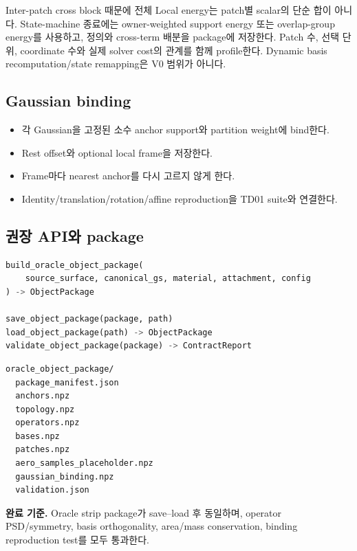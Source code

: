 \documentclass[10pt,a4paper]{article}
\newcommand{\todo}{\textcolor{TodoGray}{\(\square\)}}
\begin{document}
\begin{tcolorbox}[colback=LightOrange,colframe=orange!60!black,title=Patch energy와 계산 단위,fonttitle=\bfseries]
Inter-patch cross block 때문에 전체 Local energy는 patch별 scalar의 단순 합이 아니다.
State-machine 종료에는 owner-weighted support energy 또는 overlap-group energy를 사용하고,
정의와 cross-term 배분을 package에 저장한다. Patch 수, 선택 단위, coordinate 수와 실제 solver cost의 관계를 함께 profile한다.
Dynamic basis recomputation/state remapping은 V0 범위가 아니다.
\end{tcolorbox}

\subsection*{Gaussian binding}

\begin{itemize}
  \item[\todo] 각 Gaussian을 고정된 소수 anchor support와 partition weight에 bind한다.
  \item[\todo] Rest offset와 optional local frame을 저장한다.
  \item[\todo] Frame마다 nearest anchor를 다시 고르지 않게 한다.
  \item[\todo] Identity/translation/rotation/affine reproduction을 TD01 suite와 연결한다.
\end{itemize}

\subsection*{권장 API와 package}

\begin{lstlisting}[language=Python]
build_oracle_object_package(
    source_surface, canonical_gs, material, attachment, config
) -> ObjectPackage

save_object_package(package, path)
load_object_package(path) -> ObjectPackage
validate_object_package(package) -> ContractReport
\end{lstlisting}

\begin{lstlisting}
oracle_object_package/
  package_manifest.json
  anchors.npz
  topology.npz
  operators.npz
  bases.npz
  patches.npz
  aero_samples_placeholder.npz
  gaussian_binding.npz
  validation.json
\end{lstlisting}

\textbf{완료 기준.}
Oracle strip package가 save--load 후 동일하며, operator PSD/symmetry, basis orthogonality,
area/mass conservation, binding reproduction test를 모두 통과한다.
\end{document}
